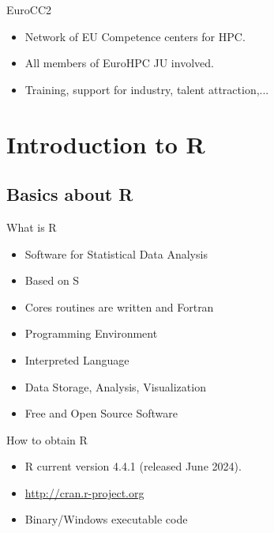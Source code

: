 \documentclass[compress,xcolor=table]{beamer}
\newcommand{\pp}{\pause}
\begin{document}
\begin{frame}{EuroCC2}
	\begin{itemize}
		\item Network of EU Competence centers for HPC.\pp
		\item All members of EuroHPC JU involved.\pp
		\item Training, support for industry, talent attraction,...
	\end{itemize}
\end{frame}




\section{Introduction to R} 
\subsection{Basics about R}

\begin{frame}{What is R}
	\begin{itemize}
		\item Software for Statistical Data Analysis
		\item  Based on S
		\item Cores routines are written and Fortran
		\item  Programming Environment
		\item  Interpreted Language
		\item  Data Storage, Analysis, Visualization
		\item  Free and Open Source Software
	\end{itemize}
\end{frame}

\begin{frame}{How to obtain R}
	\begin{itemize}
		\item R current version 4.4.1 (released June 2024).
		\item \url{http://cran.r-project.org}
		\item Binary/Windows executable code
	\end{itemize}
\end{frame}
\end{document}

